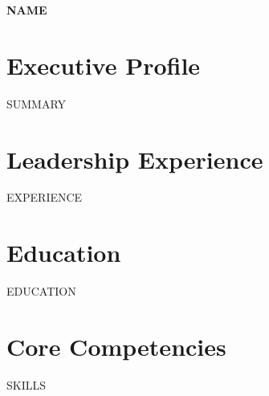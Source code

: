 \documentclass[11pt]{article}
\begin{document}
\begin{center}
{\Huge \textbf{{{NAME}}}}
\end{center}

\section*{Executive Profile}
{{SUMMARY}}

\section*{Leadership Experience}
{{EXPERIENCE}}

\section*{Education}
{{EDUCATION}}

\section*{Core Competencies}
{{SKILLS}}
\end{document}
